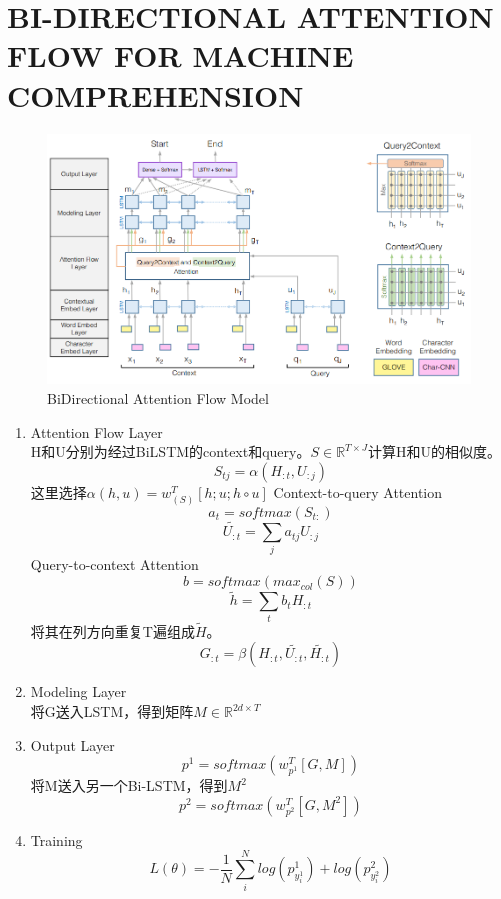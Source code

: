\documentclass[a4paper,UTF8]{article}
\numberwithin{equation}{section}
\begin{document}
\newpage
\section{BI-DIRECTIONAL ATTENTION FLOW FOR MACHINE COMPREHENSION}
\begin{figure}[H]
	\centering
	\includegraphics[width=\textwidth]{6-1.png}
	\caption{BiDirectional Attention Flow Model}
\end{figure}
\begin{enumerate}
	\item Attention Flow Layer\\H和U分别为经过BiLSTM的context和query。$S\in \mathbb{R}^{T \times J}$计算H和U的相似度。
	$$S_{tj}=\alpha(H_{:t},U_{:j})$$这里选择$\alpha(h,u)=w^T_{(S)}[h;u;h\circ u]$
	\subitem[1] Context-to-query Attention$$a_t=softmax(S_{t:})$$ $$\tilde{U_{:t}}=\sum_j a_{tj}U_{:j}$$
	\subitem[2] Query-to-context Attention\\$$b = softmax(max_{col}(S))$$ $$\tilde{h} =\sum_t b_tH_{:t}$$
	将其在列方向重复T遍组成$\tilde{H}$。
	$$G_{:t}=\beta(H_{:t},\tilde{U_{:t}},\tilde{H_{:t}})$$
	\item Modeling Layer\\将G送入LSTM，得到矩阵$M\in \mathbb{R}^{2d\times T}$
	\item Output Layer$$p^1=softmax(w_{p^1}^T[G,M])$$
	将M送入另一个Bi-LSTM，得到$M^2$ $$p^2=softmax(w_{p^2}^T[G,M^2])$$
	\item Training$$L(\theta)=-\frac{1}{N}\sum_{i}^{N}log(p_{y_i^1}^1)+log(p_{y_i^2}^2)$$
\end{enumerate}
\newpage
\end{document}
